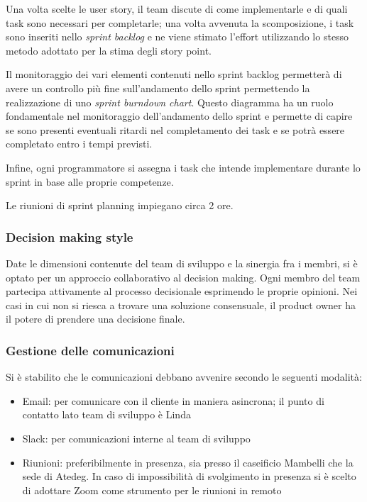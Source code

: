 Una volta scelte le user story, il team discute di come implementarle e di quali task sono necessari per completarle; una volta avvenuta la scomposizione, i task sono inseriti nello \emph{sprint backlog} e ne viene stimato l'effort utilizzando lo stesso metodo adottato per la stima degli story point.

Il monitoraggio dei vari elementi contenuti nello sprint backlog permetterà di avere un controllo più fine sull'andamento dello sprint permettendo la realizzazione di uno \emph{sprint burndown chart}. Questo diagramma ha un ruolo fondamentale nel monitoraggio dell'andamento dello sprint e permette di capire se sono presenti eventuali ritardi nel completamento dei task e se potrà essere completato entro i tempi previsti.

Infine, ogni programmatore si assegna i task che intende implementare durante lo sprint in base alle proprie competenze.

Le riunioni di sprint planning impiegano circa 2 ore.

\subsubsection{Decision making style}
Date le dimensioni contenute del team di sviluppo e la sinergia fra i membri, si è optato per un approccio collaborativo al decision making. Ogni membro del team partecipa attivamente al processo decisionale esprimendo le proprie opinioni.
Nei casi in cui non si riesca a trovare una soluzione consensuale, il product owner ha il potere di prendere una decisione finale.

\subsubsection{Gestione delle comunicazioni}
Si è stabilito che le comunicazioni debbano avvenire secondo le seguenti modalità:
\begin{itemize}
  \item Email: per comunicare con il cliente in maniera asincrona; il punto di contatto lato team di sviluppo è Linda
  \item Slack: per comunicazioni interne al team di sviluppo
  \item Riunioni: preferibilmente in presenza, sia presso il caseificio Mambelli che la sede di Atedeg. In caso di impossibilità di svolgimento in presenza si è scelto di adottare Zoom come strumento per le riunioni in remoto
\end{itemize}

